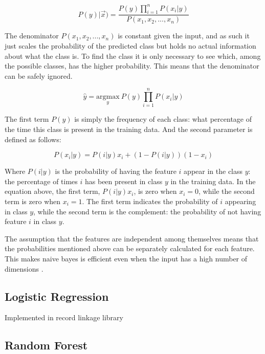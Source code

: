 \documentclass[epsfig,a4paper,11pt,titlepage,twoside,openany]{book}
\begin{document}
\begin{equation*}
    P(y) | \vec{x}) = \frac{P(y)  \prod_{i=1}^n P(x_i | y)}{P(x_1, x_2, ...,x_n)}
\end{equation*}

The denominator $P(x_1, x_2, ...,x_n)$ is constant given the input, and as such it just scales the probability of the predicted class but holds no actual information about what the class is. To find the class it is only necessary to see which, among the possible classes, has the higher probability. This means that the denominator can be safely ignored.

\begin{equation*}
    \hat{y} = \underset{y}{\mathrm{argmax}}\ P(y) \prod_{i=1}^n P(x_i | y)
\end{equation*} 

The first term $P(y)$ is simply the frequency of each class: what percentage of the time this class is present in the training data. And the second parameter is defined as follows:

\begin{equation*}
    P(x_i | y) = P(i|y)x_i + (1 - P(i|y))(1-x_i)
\end{equation*}

Where $P(i|y)$ is the probability of having the feature $i$ appear in the class $y$: the percentage of times $i$ has been present in class $y$ in the training data. In the equation above, the first term, $P(i|y)x_i$, is zero when $x_i = 0$, while the second term is zero when $x_i = 1$. The first term indicates the probability of $i$ appearing in class $y$, while the second term is the complement: the probability of not having feature $i$ in class $y$. 

The assumption that the features are independent among themselves means that the probabilities mentioned above can be separately calculated for each feature. This makes naive bayes is efficient even when the input has a high number of dimensions \cite{zhang2004_bayes_optimality}.


\subsection{Logistic Regression}
\label{sec:clf-lr}

Implemented in record linkage library \cite{recordlinkage-library}


\subsection{Random Forest}
\label{sec:clf-rgc}
\end{document}
